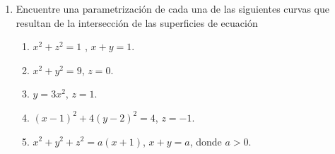 \documentclass[a4,11pt]{aleph-examen}
\begin{document}
\begin{preguntas}
\begin{respuesta}
\begin{respuesta}
\begin{respuesta}
\begin{enumerate}
\begin{respuesta}
\begin{enumerate}
            \begin{align*}
            \int_C F\cdot ds &= \int_0^{\frac{\pi}{4}} \l(54 \cos(t) \sen^2(t),54 \sen(t) \cos^2(t)\r) \cdot \l(-3 \sen(t),3 \cos(t) \r)  dt\\
            &= \int_0^{\frac{\pi}{4}} \l(162 \cos^3(t) \sen(t)-162 \sen^3(t) \cos(t)\r) dt\\
            &=\dfrac{81}{4}\\
            &= 20.25
            \end{align*}
          \item La integral de línea es:
            \begin{align*}
            \int_C F\cdot ds &= \int_0^{\frac{\pi}{2}} \l(54 \cos(t) \sen^2(t),54 \sen(t) \cos^2(t)\r) \cdot \l(-3 \sen(t),3 \cos(t) \r)  dt\\
            &= \int_0^{\frac{\pi}{2}} \l(162 \cos^3(t) \sen(t)-162 \sen^3(t) \cos(t)\r) dt\\
            &=0
            \end{align*}  
    \end{enumerate}
\end{respuesta}
\item
Encuentre una parametrización de cada una de las siguientes curvas que resultan de la intersección de las superficies de ecuación
\begin{enumerate}
    \item $x^2 + z^2 = 1$ , $x + y = 1$.
    \item $x^2 + y^2 = 9$, $z = 0$.
    \item $y = 3x^2$, $z = 1$.
    \item $(x - 1)^2 + 4(y - 2)^2 = 4$, $z = -1$.
    \item $x^2 + y^2 + z^2 = a(x + 1)$, $x + y = a$, donde $a>0$.
\end{enumerate}

\begin{respuesta}\hspace{0pt}
    

\end{respuesta}
\end{enumerate}
\end{respuesta}
\end{respuesta}
\end{respuesta}
\end{preguntas}
\end{document}
